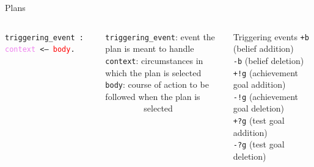 \documentclass[compress]{beamer}
\newcommand{\instruction}[1]{\textcolor{red}{#1}}
\newcommand{\belief}[1]{\textcolor{violet}{#1}}
\begin{document}
\begin{frame}{Plans}
 
    
    \begin{columns}
        \texttt{triggering\_event : \belief{context} \textless -- \instruction{body}.}\\ \vspace{1cm}
        
        \scriptsize
        \texttt{triggering\_event}: event the plan is meant to handle\\\vspace{.2cm}
        \texttt{context}: circumstances in which the plan is selected\\ \vspace{.2cm}
        \texttt{body}: course of action to be followed when the plan is\\
        \ \ \ \ \ \ \ \ \ selected\\
            
         \tiny
            \begin{block}{Triggering events}
            \texttt{+b} (belief addition)\\
            \texttt{-b} (belief deletion)\\
            
            \texttt{+!g} (achievement goal addition)\\
            \texttt{-!g} (achievement goal deletion)\\
            
            \texttt{+?g} (test goal addition)\\
            \texttt{-?g} (test goal deletion)\\
             
            \end{block}

    \end{columns}


 
\end{frame}
\end{document}
